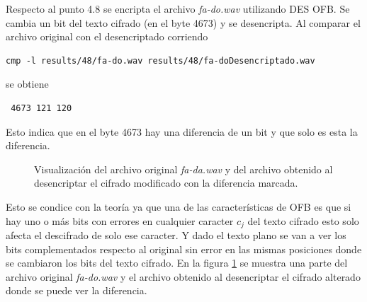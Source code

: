 \documentclass[a4paper,10pt]{article}
\begin{document}
Respecto al punto 4.8 se encripta el archivo \emph{fa-do.wav} utilizando DES OFB.
Se cambia un bit del texto cifrado (en el byte 4673) y se desencripta. Al comparar
el archivo original con el desencriptado corriendo
\begin{lstlisting}
cmp -l results/48/fa-do.wav results/48/fa-doDesencriptado.wav 
\end{lstlisting}
se obtiene 
\begin{lstlisting}
 4673 121 120
\end{lstlisting}
Esto indica que en el byte 4673 hay una diferencia de un bit y que solo es esta la diferencia.
\begin{figure}
	\begin{center}
	\end{center}
	\caption{Visualización del archivo original \emph{fa-da.wav} y del archivo obtenido 
		al desencriptar el cifrado modificado con la diferencia marcada.}
	\label{fig:48}
\end{figure}
Esto se condice con la teor\'ia ya que una de las caracter\'isticas de OFB es que si
hay uno o m\'as bits con errores en cualquier caracter $ c_{j} $ del texto cifrado
esto solo afecta el descifrado de solo ese caracter. Y dado el texto plano se van a ver
los bits complementados respecto al original sin error en las mismas posiciones donde 
se cambiaron los bits del texto cifrado. En la figura \ref{fig:48} se muestra una 
parte del archivo original \emph{fa-do.wav} y el archivo obtenido al desencriptar
el cifrado alterado donde se puede ver la diferencia.
\end{document}
